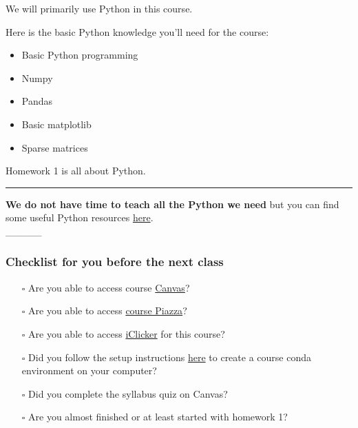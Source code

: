 \documentclass[11pt]{article}
\providecommand{\tightlist}{%
      \setlength{\itemsep}{0pt}\setlength{\parskip}{0pt}}
\begin{document}
We will primarily use Python in this course.

Here is the basic Python knowledge you'll need for the course:

\begin{itemize}
\tightlist
\item
  Basic Python programming
\item
  Numpy
\item
  Pandas
\item
  Basic matplotlib
\item
  Sparse matrices
\end{itemize}

Homework 1 is all about Python.

    \begin{center}\rule{0.5\linewidth}{0.5pt}\end{center}

\textbf{We do not have time to teach all the Python we need} but you can
find some useful Python resources
\href{https://github.com/UBC-CS/cpsc330-2023W1/blob/master/docs/resources.md}{here}.\\
\_\_\_\_\_

    

    \subsubsection{Checklist for you before the next
class}\label{checklist-for-you-before-the-next-class}

\begin{itemize}
\tightlist
\item[$\square$]
  Are you able to access course
  \href{https://canvas.ubc.ca/courses/130153}{Canvas}?
\item[$\square$]
  Are you able to access
  \href{https://piazza.com/class/lr4y28ceun367s}{course Piazza}?
\item[$\square$]
  Are you able to access \href{https://join.iclicker.com/WMSX}{iClicker}
  for this course?
\item[$\square$]
  Did you follow the setup instructions
  \href{https://github.com/UBC-CS/cpsc330-2023W2/blob/main/docs/setup.md}{here}
  to create a course conda environment on your computer?
\item[$\square$]
  Did you complete the syllabus quiz on Canvas?
\item[$\square$]
  Are you almost finished or at least started with homework 1?
\end{itemize}
\end{document}
